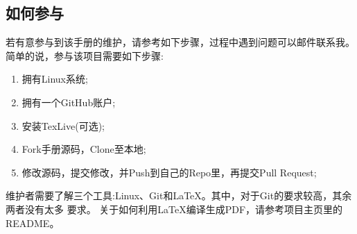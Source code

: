 \subsection{如何参与}
若有意参与到该手册的维护，请参考如下步骤，过程中遇到问题可以邮件联系我。
简单的说，参与该项目需要如下步骤:
\begin{enumerate}
\item 拥有Linux系统;
\item 拥有一个GitHub账户;
\item 安装TexLive(可选);
\item Fork手册源码，Clone至本地;
\item 修改源码，提交修改，并Push到自己的Repo里，再提交Pull Request;
\end{enumerate}
维护者需要了解三个工具:Linux、Git和LaTeX。其中，对于Git的要求较高，其余两者没有太多
要求。
关于如何利用LaTeX编译生成PDF，请参考项目主页里的README。
